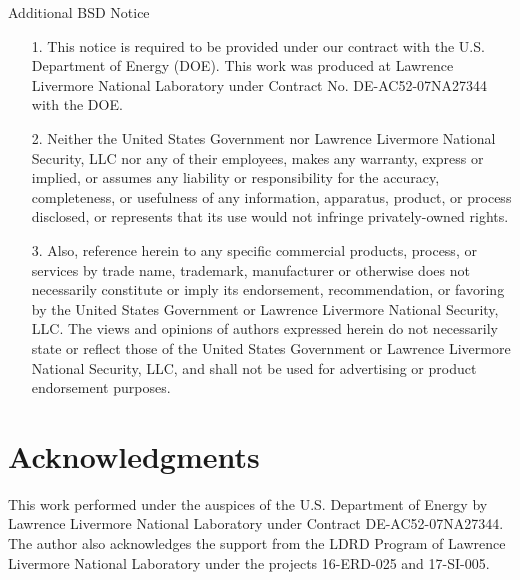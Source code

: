 \begin{center}
{\begin{minipage}{0.9\textwidth}
\medskip

Additional BSD Notice
\begin{itemize}
\item[1.] This notice is required to be provided under our contract with the U.S. Department 
of Energy (DOE). This work was produced at Lawrence Livermore National Laboratory under 
Contract No. DE-AC52-07NA27344 with the DOE.
\item[2.] Neither the United States Government nor Lawrence Livermore National Security, LLC 
nor any of their employees, makes any warranty, express or implied, or assumes any 
liability or responsibility for the accuracy, completeness, or usefulness of any 
information, apparatus, product, or process disclosed, or represents that its use would
not infringe privately-owned rights.
\item[3.] Also, reference herein to any specific commercial products, process, or services by 
trade name, trademark, manufacturer or otherwise does not necessarily constitute or 
imply its endorsement, recommendation, or favoring by the United States Government or 
Lawrence Livermore National Security, LLC. The views and opinions of authors expressed 
herein do not necessarily state or reflect those of the United States Government or 
Lawrence Livermore National Security, LLC, and shall not be used for advertising or 
product endorsement purposes.
\end{itemize}
\end{minipage}}\end{center}

\section{Acknowledgments}
This work performed under the auspices of the U.S. Department of Energy by Lawrence Livermore National Laboratory under Contract DE-AC52-07NA27344. The author also acknowledges the support from the LDRD Program of Lawrence Livermore National Laboratory under the projects 16-ERD-025 and 17-SI-005.












